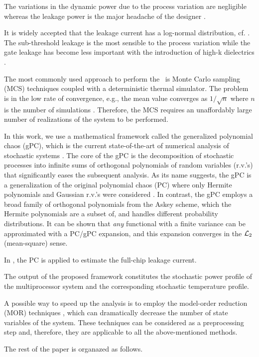 The variations in the dynamic power due to the process variation are negligible whereas the leakage power is the major headache of the designer \cite{juan2012, srivastava2010}.

It is widely accepted that the leakage current has a log-normal distribution, cf. \cite{juan2012, srivastava2010}. The sub-threshold leakage is the most sensible to the process variation while the gate leakage has become less important with the introduction of high-k dielectrics \cite{juan2012}.

The most commonly used approach to perform the \sta\ is Monte Carlo sampling (MCS) techniques coupled with a deterministic thermal simulator. The problem is in the low rate of convergence, e.g., the mean value converges as $1/\sqrt{n}$ where $n$ is the number of simulations \cite{xiu2009}. Therefore, the MCS requires an unaffordably large number of realizations of the system to be performed.

In this work, we use a mathematical framework called the generalized polynomial chaos (gPC), which is the current state-of-the-art of numerical analysis of stochastic systems \cite{xiu2009, xiu2002}. The core of the gPC is the decomposition of stochastic processes into infinite sums of orthogonal polynomials of random variables (r.v.'s) that significantly eases the subsequent analysis. As its name suggests, the gPC is a generalization of the original polynomial chaos (PC) where only Hermite polynomials and Gaussian r.v.'s were considered \cite{ghanem1991}. In contrast, the gPC employs a broad family of orthogonal polynomials from the Askey scheme, which the Hermite polynomials are a subset of, and handles different probability distributions. It can be shown that \emph{any} functional with a finite variance can be approximated with a PC/gPC expansion, and this expansion converges in the $\mathcal{L}_{2}$ (mean-square) sense.

In \cite{shen2009}, the PC is applied to estimate the full-chip leakage current.

The output of the proposed framework constitutes the stochastic power profile of the multiprocessor system and the corresponding stochastic temperature profile.

A possible way to speed up the analysis is to employ the model-order reduction (MOR) techniques \cite{benner2011}, which can dramatically decrease the number of state variables of the system. These techniques can be considered as a preprocessing step and, therefore, they are applicable to all the above-mentioned methods.

The rest of the paper is organazed as follows.
